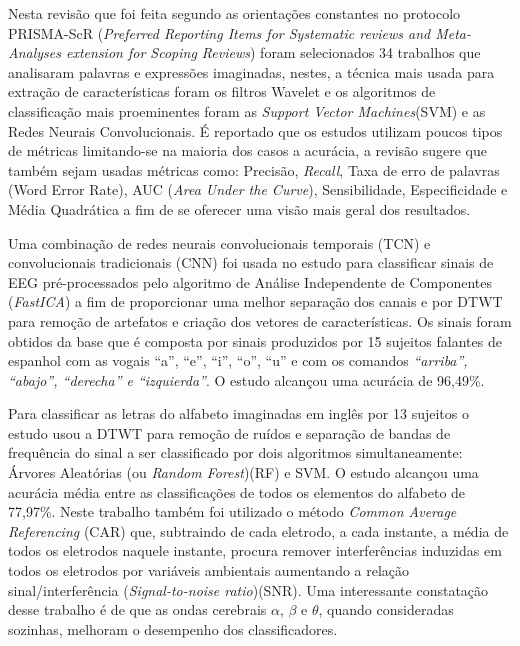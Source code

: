 			\par Nesta revisão \cite{ShahUzair2022TRoA} que foi feita segundo as orientações constantes no protocolo PRISMA-ScR (\textit{Preferred Reporting Items for Systematic reviews and Meta-Analyses extension for Scoping Reviews}) foram selecionados 34 trabalhos que analisaram palavras e expressões imaginadas, nestes, a técnica mais usada para extração de características foram os filtros Wavelet e os algoritmos de classificação mais proeminentes foram as \textit{Support Vector Machines}(SVM) e as Redes Neurais Convolucionais. É reportado que os estudos utilizam poucos tipos de métricas limitando-se na maioria dos casos a acurácia, a revisão sugere que também sejam usadas métricas como: Precisão, \textit{Recall}, Taxa de erro de palavras (Word Error Rate), AUC (\textit{Area Under the Curve}), Sensibilidade, Especificidade e Média Quadrática a fim de se oferecer uma visão mais geral dos resultados. 
			
			\par Uma combinação de redes neurais convolucionais temporais (TCN) e convolucionais tradicionais (CNN) foi usada no estudo \cite{MahapatraNrushinghCharan2022MCoI} para classificar sinais de EEG pré-processados pelo algoritmo de Análise Independente de Componentes (\textit{FastICA}) a fim de proporcionar uma melhor separação dos canais e por DTWT para remoção de artefatos e criação dos vetores de características. Os sinais foram obtidos da base \cite{10.1117/12.2255697} que é composta por sinais produzidos por 15 sujeitos falantes de espanhol com as vogais ``a'', ``e'', ``i'', ``o'', ``u'' e com os comandos \textit{``arriba'', ``abajo'', ``derecha'' e ``izquierda''}. O estudo alcançou uma acurácia de 96,49\%.

			\par Para classificar as letras do alfabeto imaginadas em inglês por 13 sujeitos o estudo \cite{AgarwalPrabhakar2022Ebia} usou a DTWT para remoção de ruídos e separação de bandas de frequência do sinal a ser classificado por dois algoritmos simultaneamente: Árvores Aleatórias (ou \textit{Random Forest})(RF) e SVM. O estudo alcançou uma acurácia média entre as classificações de todos os elementos do alfabeto de 77,97\%. Neste trabalho também foi utilizado o método \textit{Common Average Referencing} (CAR) que, subtraindo de cada eletrodo, a cada instante, a média de todos os eletrodos naquele instante, procura remover interferências induzidas em todos os eletrodos por variáveis ambientais aumentando a relação sinal/interferência (\textit{Signal-to-noise ratio})(SNR). Uma interessante constatação desse trabalho é de que as ondas cerebrais $\alpha$, $\beta$ e $\theta$, quando consideradas sozinhas, melhoram o desempenho dos classificadores.
			

